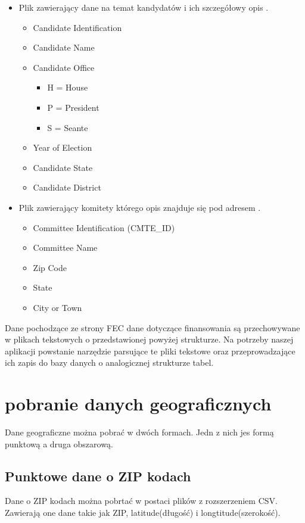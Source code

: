 \documentclass[10pt,a4paper]{article}
\begin{document}
\begin{itemize}
\item Plik zawierający dane na temat kandydatów i ich szczegółowy opis \cite{fecCandMasterFile2015}.

\begin{itemize}
\item Candidate Identification
\item Candidate Name
\item Candidate Office
\begin{itemize}
\item H = House
\item P = President
\item S = Seante
\end{itemize}
\item Year of Election
\item Candidate State
\item Candidate District
\end{itemize}


\item Plik zawierający komitety którego opis znajduje się pod adresem \cite{fecComMasterFile2015}.

\begin{itemize}
\item Committee Identification (CMTE\_ID)
\item Committee Name
\item Zip Code
\item State
\item City or Town
\end{itemize}
\end{itemize}


Dane pochodzące ze strony FEC dane dotyczące finansowania są przechowywane w plikach tekstowych o przedstawionej powyżej strukturze. Na potrzeby naszej aplikacji powstanie narzędzie parsujące te pliki tekstowe oraz przeprowadzające ich zapis do bazy danych o analogicznej strukturze tabel. 
\section{pobranie danych geograficznych}
Dane geograficzne można pobrać w dwóch formach. Jedn z nich jes formą punktową a druga obszarową.
\subsection{Punktowe dane o ZIP kodach\label{sec:punktZIP}}
Dane o ZIP kodach można pobrtać w postaci plików z rozszerzeniem CSV. Zawierają one dane takie jak ZIP, latitude(długość) i longtitude(szerokość).
\end{document}
